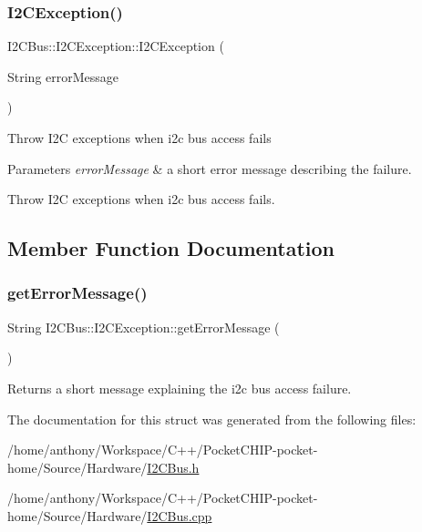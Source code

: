\subsubsection{\texorpdfstring{I2\+C\+Exception()}{I2CException()}}
{\footnotesize\ttfamily I2\+C\+Bus\+::\+I2\+C\+Exception\+::\+I2\+C\+Exception (\begin{DoxyParamCaption}\item[{String}]{error\+Message }\end{DoxyParamCaption})}

Throw I2C exceptions when i2c bus access fails 
\begin{DoxyParams}{Parameters}
{\em error\+Message} & a short error message describing the failure.\\
\hline
\end{DoxyParams}
Throw I2C exceptions when i2c bus access fails. 

\subsection{Member Function Documentation}
\mbox{\label{structI2CBus_1_1I2CException_ab7ca1648faf3309155c22aec12019b10}} 
\subsubsection{\texorpdfstring{get\+Error\+Message()}{getErrorMessage()}}
{\footnotesize\ttfamily String I2\+C\+Bus\+::\+I2\+C\+Exception\+::get\+Error\+Message (\begin{DoxyParamCaption}{ }\end{DoxyParamCaption})}

\begin{DoxyReturn}{Returns}
a short message explaining the i2c bus access failure. 
\end{DoxyReturn}


The documentation for this struct was generated from the following files\+:\begin{DoxyCompactItemize}
\item 
/home/anthony/\+Workspace/\+C++/\+Pocket\+C\+H\+I\+P-\/pocket-\/home/\+Source/\+Hardware/\mbox{\hyperlink{I2CBus_8h}{I2\+C\+Bus.\+h}}\item 
/home/anthony/\+Workspace/\+C++/\+Pocket\+C\+H\+I\+P-\/pocket-\/home/\+Source/\+Hardware/\mbox{\hyperlink{I2CBus_8cpp}{I2\+C\+Bus.\+cpp}}\end{DoxyCompactItemize}

